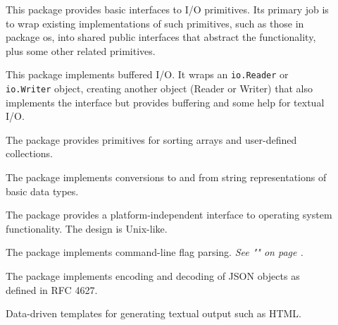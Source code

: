 \begin{description}
\item[]{
This package provides basic interfaces to I/O primitives.
Its primary job is to wrap existing implementations of such primitives,
such as those in package os, into shared public interfaces that
abstract the functionality, plus some other related primitives.
}
\item[]{
This package implements buffered I/O.  It wraps an 
\lstinline{io.Reader}
or
\lstinline{io.Writer}
object, creating another object (Reader or Writer) that also implements
the interface but provides buffering and some help for textual I/O.
}
\item[]{
The  package provides primitives for sorting arrays
and user-defined collections.
}
\item[]{
The  package implements conversions to and from
string representations of basic data types.
}
\item[]{
The  package provides a platform-independent interface to operating
system functionality.  The design is Unix-like.
}
\item[]{
The  package implements command-line flag parsing. 
\emph{See ""
on page \pageref{sec:option parsing}.}
}
\item[]{
The  package implements encoding and decoding of JSON objects as
defined in RFC 4627.
}
\item[]{
Data-driven templates for generating textual output such as HTML.

}
\end{description}
